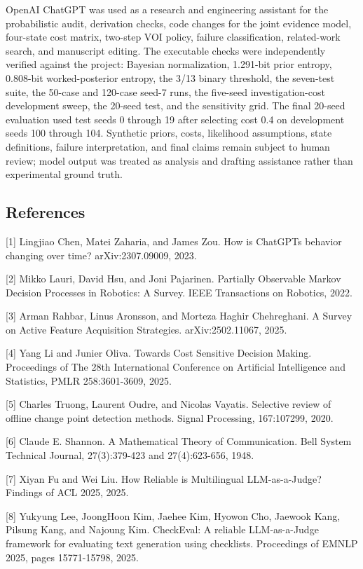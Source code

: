 \documentclass[
]{article}
\begin{document}
OpenAI ChatGPT was used as a research and engineering assistant for the probabilistic audit, derivation checks, code changes for the joint evidence model, four-state cost matrix, two-step VOI policy, failure classification, related-work search, and manuscript editing. The executable checks were independently verified against the project: Bayesian normalization, 1.291-bit prior entropy, 0.808-bit worked-posterior entropy, the 3/13 binary threshold, the seven-test suite, the 50-case and 120-case seed-7 runs, the five-seed investigation-cost development sweep, the 20-seed test, and the sensitivity grid. The final 20-seed evaluation used test seeds 0 through 19 after selecting cost 0.4 on development seeds 100 through 104. Synthetic priors, costs, likelihood assumptions, state definitions, failure interpretation, and final claims remain subject to human review; model output was treated as analysis and drafting assistance rather than experimental ground truth.

\subsection{References}\label{references}

{[}1{]} Lingjiao Chen, Matei Zaharia, and James Zou. How is ChatGPT\textquotesingle s behavior changing over time? arXiv:2307.09009, 2023.

{[}2{]} Mikko Lauri, David Hsu, and Joni Pajarinen. Partially Observable Markov Decision Processes in Robotics: A Survey. IEEE Transactions on Robotics, 2022.

{[}3{]} Arman Rahbar, Linus Aronsson, and Morteza Haghir Chehreghani. A Survey on Active Feature Acquisition Strategies. arXiv:2502.11067, 2025.

{[}4{]} Yang Li and Junier Oliva. Towards Cost Sensitive Decision Making. Proceedings of The 28th International Conference on Artificial Intelligence and Statistics, PMLR 258:3601-3609, 2025.

{[}5{]} Charles Truong, Laurent Oudre, and Nicolas Vayatis. Selective review of offline change point detection methods. Signal Processing, 167:107299, 2020.

{[}6{]} Claude E. Shannon. A Mathematical Theory of Communication. Bell System Technical Journal, 27(3):379-423 and 27(4):623-656, 1948.

{[}7{]} Xiyan Fu and Wei Liu. How Reliable is Multilingual LLM-as-a-Judge? Findings of ACL 2025, 2025.

{[}8{]} Yukyung Lee, JoongHoon Kim, Jaehee Kim, Hyowon Cho, Jaewook Kang, Pilsung Kang, and Najoung Kim. CheckEval: A reliable LLM-as-a-Judge framework for evaluating text generation using checklists. Proceedings of EMNLP 2025, pages 15771-15798, 2025.
\end{document}
